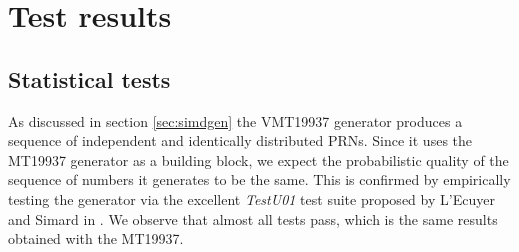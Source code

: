 \documentclass[preprint,1p,times]{elsarticle}
\begin{document}
			\section{Test results}
			
			\subsection{Statistical tests}
			As discussed in section \ref{sec:simdgen} the VMT19937 generator produces a sequence of independent and identically distributed PRNs. Since it uses the MT19937 generator as a building block, we expect the probabilistic quality of the sequence of numbers it generates to be the same. This is confirmed by empirically testing the generator via the excellent \textit{TestU01} test suite proposed by  L'Ecuyer and Simard in \cite{testu01}. We observe that almost all tests pass, which is the same results obtained with the MT19937.
			
\end{document}
